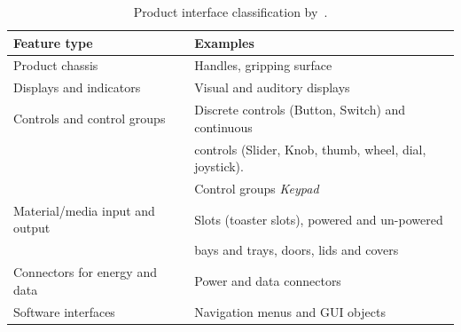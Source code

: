 \begin{table}
  \caption{Product interface classification by~\citet{persad_characterising_2007}.}
  \label{tbl:persad_product_interface}
\footnotesize
\centering
    \begin{tabular}{l l}
    \hline
    \textbf{Feature type} & \textbf{Examples} \\
    \hline
    Product chassis & Handles, gripping surface \\
    Displays and indicators & Visual and auditory displays \\
    Controls and control groups & Discrete controls (Button, Switch) and continuous\\
    & controls (Slider, Knob, thumb, wheel, dial, joystick). \\
    & Control groups \textit{Keypad} \\
    Material/media input and output & Slots (toaster slots), powered and un-powered\\
    & bays and trays, doors, lids and covers\\
    Connectors for energy and data & Power and data connectors \\
    Software interfaces & Navigation menus and GUI objects \\
    \hline
  \end{tabular}
\end{table}